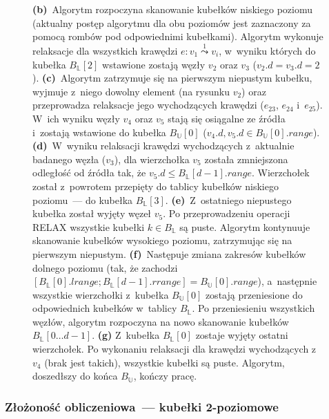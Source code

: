 \begin{figure}[!htbp]
\begin{subfigure}[b]{\textwidth}
\begin{subfigure}[b]{0.495\textwidth}
			\caption{}
			\label{fig:exampleDoubleLevelBuckets:g}
		\end{subfigure}
		\hfill\null
	\end{subfigure}
	\caption{
		\textbf{(b)}~Algorytm rozpoczyna skanowanie kubełków niskiego poziomu (aktualny postęp algorytmu dla obu poziomów jest zaznaczony za pomocą rombów pod odpowiednimi kubełkami).
		Algorytm wykonuje relaksacje dla wszystkich krawędzi $e : v_{1} \overset{1}\leadsto v_{i}$, w~wyniku których do kubełka $B_{\mathbb{L}} \left[ 2\right]$ wstawione zostają węzły $v_{2}$ oraz $v_{3}$ ($v_{2}.d = v_{3}.d = 2$).
		\textbf{(c)}~Algorytm zatrzymuje się na pierwszym niepustym kubełku, wyjmuje z~niego dowolny element (na rysunku $v_{2}$) oraz przeprowadza relaksacje jego wychodzących krawędzi ($e_{23}$, $e_{24}$ i~$e_{25}$).
		W~ich wyniku węzły $v_{4}$ oraz $v_{5}$ stają się osiągalne ze źródła i~zostają wstawione do kubełka $B_{\mathbb{U}} \left[ 0 \right]$ ($v_{4}.d, v_{5}.d \in B_{\mathbb{U}} \left[ 0 \right].range$).
		\textbf{(d)}~W~wyniku relaksacji krawędzi wychodzących z~aktualnie badanego węzła ($v_{3}$), dla wierzchołka $v_{5}$ została zmniejszona odległość od źródła tak, że $v_{5}.d \leqslant B_{\mathbb{L}} \left[ d - 1 \right].range$.
		Wierzchołek został z~powrotem przepięty do tablicy kubełków niskiego poziomu~--- do kubełka $B_{\mathbb{L}} \left[ 3 \right]$.
		\textbf{(e)}~Z~ostatniego niepustego kubełka został wyjęty węzeł $v_{5}$.
		Po przeprowadzeniu operacji \textsc{RELAX} wszystkie kubełki $k \in B_{\mathbb{L}}$ są puste.
		Algorytm kontynuuje skanowanie kubełków wysokiego poziomu, zatrzymując się na pierwszym niepustym.
		\textbf{(f)}~Następuje zmiana zakresów kubełków dolnego poziomu (tak, że zachodzi $ \left[ B_{\mathbb{L}} \left[ 0 \right].lrange ; B_{\mathbb{L}} \left[ d - 1 \right].rrange \right] = B_{\mathbb{U}} \left[ 0 \right].range$), a~następnie wszystkie wierzchołki z~kubełka $B_{\mathbb{U}} \left[ 0 \right]$ zostają przeniesione do odpowiednich kubełków w~tablicy $B_{\mathbb{L}}$.
		Po przeniesieniu wszystkich węzłów, algorytm rozpoczyna na nowo skanowanie kubełków $B_{\mathbb{L}} \left[ 0 \dots d-1 \right]$.
		\textbf{(g)} Z~kubełka $B_{\mathbb{L}} \left[ 0 \right]$ zostaje wyjęty ostatni wierzchołek.
		Po wykonaniu relaksacji dla krawędzi wychodzących z~$v_{4}$ (brak jest takich), wszystkie kubełki są puste.
		Algorytm, doszedłszy do końca $B_{\mathbb{U}}$, kończy pracę.
	}
	\label{fig:exampleDoubleLevelBucketsB}
\end{figure}


\subsubsection{Złożoność obliczeniowa~--- kubełki 2-poziomowe}


